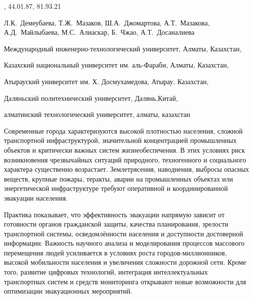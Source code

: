 , 44.01.87, 81.93.21

\begin{header}

Л.К.~Демеубаева,
Т.Ж.~Мазаков\envelope,
Ш.А.~Джомартова,
А.Т.~Мазакова,
А.Д.~Майлыбаева,
М.С.~Алиаскар,
Б.~Чжао,
А.Т.~Досаналиева
\end{header}

\begin{affil}
Международный инженерно-технологический университет, Алматы, Казахстан,

Казахский национальный университет им. аль-Фараби, Алматы, Казахстан,

Атырауский университет им. Х. Досмухамедова, Атырау, Казахстан,

Даляньский политехнический университет, Далянь,Китай,

алматинский технологический университет, алматы, казахстан

\end{affil}

Современные города характеризуются высокой плотностью населения, сложной
транспортной инфраструктурой, значительной концентрацией промышленных
объектов и критически важных систем жизнеобеспечения. В этих условиях
риск возникновения чрезвычайных ситуаций природного, техногенного и
социального характера существенно возрастает. Землетрясения, наводнения,
выбросы опасных веществ, крупные пожары, теракты, аварии на промышленных
объектах или энергетической инфраструктуре требуют оперативной и
координированной эвакуации населения.

Практика показывает, что эффективность эвакуации напрямую зависит от
готовности органов гражданской защиты, качества планирования, зрелости
транспортной системы, осведомлённости населения и доступности
достоверной информации. Важность научного анализа и моделирования
процессов массового перемещения людей усиливается в условиях роста
городов-миллионников, высокой мобильности населения и увеличения
сложности дорожной сети. Кроме того, развитие цифровых технологий,
интеграция интеллектуальных транспортных систем и средств мониторинга
открывают новые возможности для оптимизации эвакуационных мероприятий.

